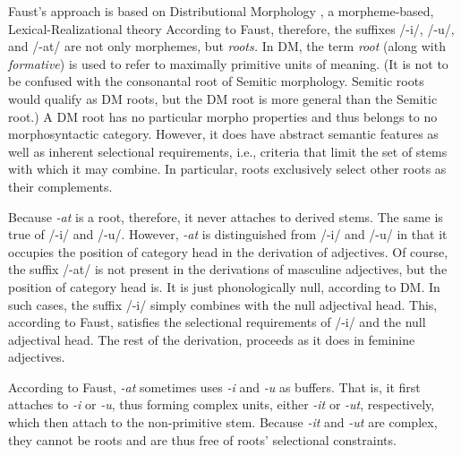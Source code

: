 Faust's approach is based on Distributional Morphology 
 \citep{halle-and-marantz:1993}, 
a morpheme-based, Lexical-Realizational theory \citep{stump:2001}
According to Faust, therefore, the suffixes /-i/, /-u/, and /-at/ are not only morphemes, 
but \emph{roots.}
In \ac{DM}, the term \emph{root} (along with \emph{formative}) is used to refer 
to maximally primitive units of meaning. (It is not to be confused with the 
consonantal root of Semitic morphology. Semitic roots would qualify as 
\ac{DM} roots, but the \ac{DM} root is more general than the Semitic root.)
A \ac{DM} root has no particular morpho properties and thus belongs to 
no morphosyntactic category.
However, it does have abstract semantic features as well as inherent 
selectional requirements, i.e., criteria that limit the set of stems with which it 
may combine. In particular, roots exclusively select 
other roots as their complements. %

Because \textit{-at} is a root, therefore, it
never attaches to derived stems. The same is true of /-i/ and /-u/.  
However, \textit{-at} is distinguished from /-i/ and /-u/ in that it occupies the 
position of category head in the derivation of adjectives.
Of course, the suffix /-at/ is not present in the derivations of 
masculine adjectives, 
but the position of category head is. 
It is just phonologically null, according to \ac{DM}.
In such cases, the suffix /-i/ simply combines with the null adjectival head. 
This, according to Faust, satisfies the selectional requirements of /-i/
and the null adjectival head. The rest of the derivation,
proceeds as it does in feminine adjectives. 

According to Faust, \textit{-at} sometimes uses \textit{-i} and 
\textit{-u} as buffers. That is, it first attaches to \textit{-i} or \textit{-u}, 
thus forming complex units, either \emph{-it} or \emph{-ut}, respectively, 
which then attach to
the non-primitive stem. Because \emph{-it} and \emph{-ut} are complex, 
they cannot be roots and are thus free of roots' selectional constraints.


